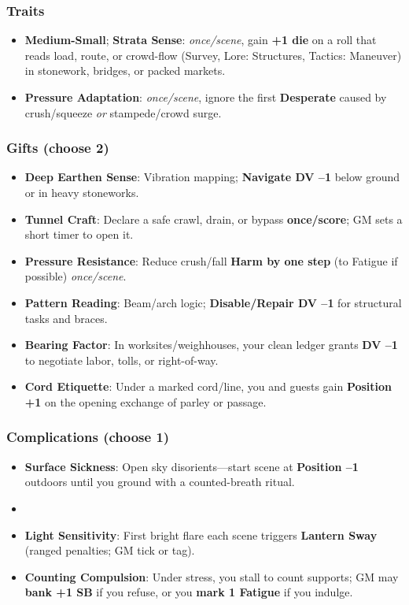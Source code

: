 \documentclass[11pt]{book}
\begin{document}
\subsubsection*{Traits}
\begin{itemize}
    \item \textbf{Medium-Small}; \textbf{Strata Sense}: \emph{once/scene}, gain \textbf{+1 die} on a roll that reads load, route, or crowd-flow (Survey, Lore: Structures, Tactics: Maneuver) in stonework, bridges, or packed markets.
    \item \textbf{Pressure Adaptation}: \emph{once/scene}, ignore the first \textbf{Desperate} caused by crush/squeeze \emph{or} stampede/crowd surge.
\end{itemize}

\subsubsection*{Gifts (choose 2)}
\begin{itemize}
    \item \textbf{Deep Earthen Sense}: Vibration mapping; \textbf{Navigate DV --1} below ground or in heavy stoneworks.
    \item \textbf{Tunnel Craft}: Declare a safe crawl, drain, or bypass \textbf{once/score}; GM sets a short timer to open it.
    \item \textbf{Pressure Resistance}: Reduce crush/fall \textbf{Harm by one step} (to Fatigue if possible) \emph{once/scene}.
    \item \textbf{Pattern Reading}: Beam/arch logic; \textbf{Disable/Repair DV --1} for structural tasks and braces.
    \item \textbf{Bearing Factor}: In worksites/weighhouses, your clean ledger grants \textbf{DV --1} to negotiate labor, tolls, or right-of-way.
    \item \textbf{Cord Etiquette}: Under a marked cord/line, you and guests gain \textbf{Position +1} on the opening exchange of parley or passage.
\end{itemize}

\subsubsection*{Complications (choose 1)}
\begin{itemize}
    \item \textbf{Surface Sickness}: Open sky disorients---start scene at \textbf{Position --1} outdoors until you ground with a counted-breath ritual.
    \item \item \textbf{Light Sensitivity}: First bright flare each scene triggers \textbf{Lantern Sway} (ranged penalties; GM tick or tag).
    \item \textbf{Counting Compulsion}: Under stress, you stall to count supports; GM may \textbf{bank +1 SB} if you refuse, or you \textbf{mark 1 Fatigue} if you indulge.
\end{itemize}
\end{document}
